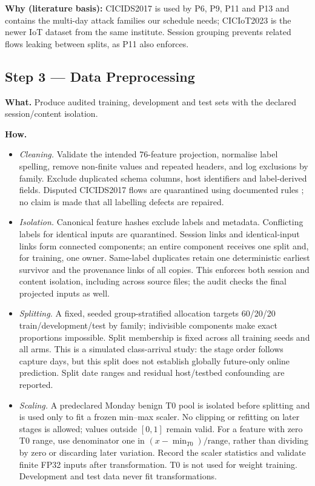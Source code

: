 \documentclass[10pt,a4paper]{article}
\newcommand{\why}[1]{\par\nopagebreak[4]\noindent\colorbox{black!5}{\parbox{\dimexpr\linewidth-2\fboxsep}{\small\textbf{Why (literature basis):} #1}}\par}
\begin{document}
\why{CICIDS2017 is used by P6, P9, P11 and P13 and contains the multi-day attack families our schedule needs; CICIoT2023 is the newer IoT dataset from the same institute. Session grouping prevents related flows leaking between splits, as P11 also enforces.}

\subsection{Step 3 --- Data Preprocessing}
\textbf{What.} Produce audited training, development and test sets with the declared session/content isolation.

\textbf{How.}
\begin{itemize}
\item \emph{Cleaning.} Validate the intended 76-feature projection, normalise label spelling, remove non-finite values and repeated headers, and log exclusions by family. Exclude duplicated schema columns, host identifiers and label-derived fields. Disputed CICIDS2017 flows are quarantined using documented rules \cite{engelen}; no claim is made that all labelling defects are repaired.
\item \emph{Isolation.} Canonical feature hashes exclude labels and metadata. Conflicting labels for identical inputs are quarantined. Session links and identical-input links form connected components; an entire component receives one split and, for training, one owner. Same-label duplicates retain one deterministic earliest survivor and the provenance links of all copies. This enforces both session and content isolation, including across source files; the audit checks the final projected inputs as well.
\item \emph{Splitting.} A fixed, seeded group-stratified allocation targets 60/20/20 train/development/test by family; indivisible components make exact proportions impossible. Split membership is fixed across all training seeds and all arms. This is a simulated class-arrival study: the stage order follows capture days, but this split does not establish globally future-only online prediction. Split date ranges and residual host/testbed confounding are reported.
\item \emph{Scaling.} A predeclared Monday benign T0 pool is isolated before splitting and is used only to fit a frozen min--max scaler. No clipping or refitting on later stages is allowed; values outside $[0,1]$ remain valid. For a feature with zero T0 range, use denominator one in $(x-\min_{T0})/\mathrm{range}$, rather than dividing by zero or discarding later variation. Record the scaler statistics and validate finite FP32 inputs after transformation. T0 is not used for weight training. Development and test data never fit transformations.

\end{itemize}
\end{document}
